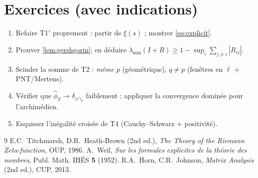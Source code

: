 \documentclass[11pt,a4paper]{proofarticle}
\begin{document}
\section*{Exercices (avec indications)}
\begin{enumerate}
\item Refaire T1$′$ proprement : partir de $\xi(s)$ ; montrer \eqref{eq:explicit}.
\item Prouver \cref{lem:gershgorin}; en déduire $\lambda_{\min}(I+R)\ge 1-\sup_i\sum_{j\ne i}|R_{ij}|$.
\item Scinder la somme de T2 : \emph{même $p$} (géométrique), \emph{$q\ne p$} (fenêtres en $\ell$ + PNT/Mertens).
\item Vérifier que $\widehat\phi_T\to \delta_{\pm\gamma_0}$ faiblement ; appliquer la convergence dominée pour l’archimédien.
\item Esquisser l’inégalité croisée de T4 (Cauchy–Schwarz + positivité).
\end{enumerate}

\begin{thebibliography}{9}
E.C.~Titchmarsh, D.R.~Heath-Brown (2nd ed.), \emph{The Theory of the Riemann Zeta-function}, OUP, 1986.
A.~Weil, \emph{Sur les formules explicites de la théorie des nombres}, Publ. Math. IHÉS \textbf{5} (1952).
R.A.~Horn, C.R.~Johnson, \emph{Matrix Analysis} (2nd ed.), CUP, 2013.
\end{thebibliography}
\end{document}
